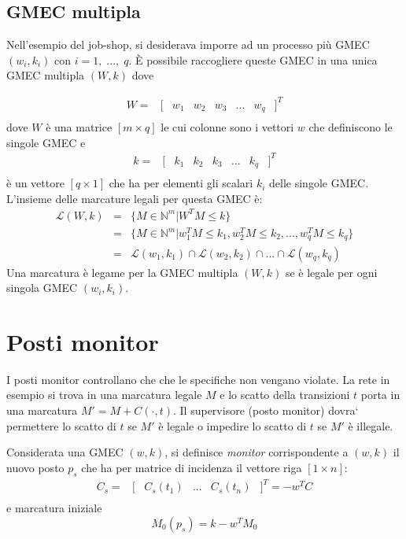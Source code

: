 \documentclass[a4paper]{report}
\begin{document}
\subsection{GMEC multipla}
Nell'esempio del job-shop, si desiderava imporre ad un processo pi\`u
GMEC $(w_i, k_i)$ con $i = 1,\;...,\;q$. \`E possibile raccogliere
queste GMEC in una unica GMEC multipla $(W, k)$ dove 

\[
\begin{array}{cccccccc}
  W = & [ & w_1 & w_2 & w_3 & ... & w_q & ]^T\\
\end{array}
\]
dove $W$ \`e una matrice $[m \times q]$ le cui colonne sono i vettori
$w$ che definiscono le singole GMEC e
\[
\begin{array}{cccccccc}
  k = & [ & k_1 & k_2 & k_3 & ... & k_q & ]^T\\
\end{array}
\]
\`e un vettore $[q \times 1]$ che ha per elementi gli scalari $k_i$
delle singole GMEC.
L'insieme delle marcature legali per questa GMEC \`e:
\[
\begin{array}{ccc}
\mathcal{L}(W,k) & = & \{ M \in \mathbb{N}^m | W^T M \leq k\}\\
 & = & \{ M \in \mathbb{N}^m | w_1^T M \leq k_1, w_2^T M \leq k_2,
..., w_q^T M \leq k_q \}\\
 & = & \mathcal{L} (w_1, k_1) \cap \mathcal{L} (w_2, k_2) \cap
... \cap \mathcal{L} (w_q, k_q)
\end{array}
\]
Una marcatura \`e legame per la GMEC multipla $(W,k)$ se \`e legale per ogni
singola GMEC $(w_i, k_i)$.

\section{Posti monitor}
I posti monitor controllano che che le specifiche non vengano
violate. La rete in esempio si trova in una marcatura legale $M$ e lo
scatto della transizioni $t$ porta in una marcatura $M' = M + C(\cdot,
t)$. Il supervisore (posto monitor) dovra` permettere lo scatto di $t$
se $M'$ \`e legale o impedire lo scatto di $t$ se $M'$ \`e illegale.

Considerata una GMEC $(w,k)$, si definisce {\em monitor}
corrispondente a $(w,k)$ il nuovo posto $p_s$ che ha per matrice di
incidenza il vettore riga $[1 \times n]$:
\[
\begin{array}{cccccc}
  C_s = & [ & C_s(t_1) & ... & C_s(t_n) & ]^T = -w^T C\\
\end{array}
\]
e marcatura iniziale
\[
M_0(p_s) = k - w^T M_0
\]
\end{document}
